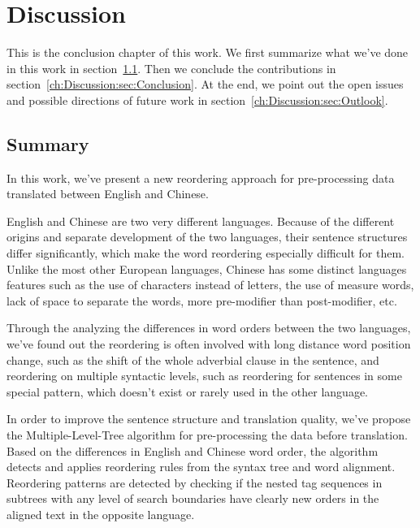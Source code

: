 

\chapter{Discussion}
\label{ch:Discussion}

This is the conclusion chapter of this work. We first summarize what we've done in this work in section~\ref{ch:Discussion:sec:Summary}. Then we conclude the contributions in section~\ref{ch:Discussion:sec:Conclusion}. At the end, we point out the open issues and possible directions of future work in section~\ref{ch:Discussion:sec:Outlook}.

\section{Summary}
\label{ch:Discussion:sec:Summary}

In this work, we've present a new reordering approach for pre-processing data translated between English and Chinese.

English and Chinese are two very different languages. Because of the different origins and separate development of the two languages, their sentence structures differ significantly, which make the word reordering especially difficult for them. Unlike the most other European languages, Chinese has some distinct languages features such as the use of characters instead of letters, the use of measure words, lack of space to separate the words, more pre-modifier than post-modifier, etc.

Through the analyzing the differences in word orders between the two languages, we've found out the reordering is often involved with long distance word position change, such as the shift of the whole adverbial clause in the sentence, and reordering on multiple syntactic levels, such as reordering for sentences in some special pattern, which doesn't exist or rarely used in the other language.

In order to improve the sentence structure and translation quality, we've propose the Multiple-Level-Tree algorithm for pre-processing the data before translation. Based on the differences in English and Chinese word order, the algorithm detects and applies reordering rules from the syntax tree and word alignment. Reordering patterns are detected by checking if the nested tag sequences in subtrees with any level of search boundaries have clearly new orders in the aligned text in the opposite language.

